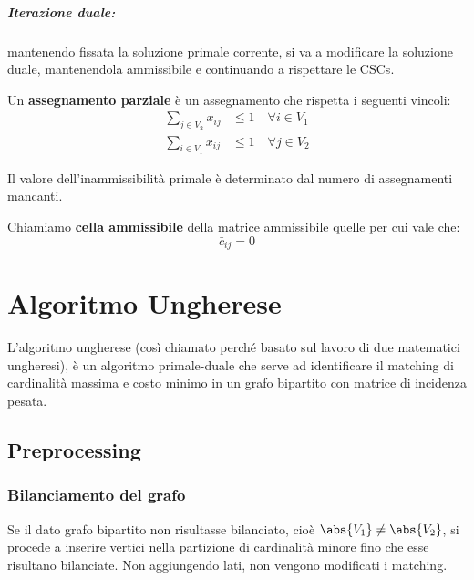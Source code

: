 \documentclass[\main/main.tex]{subfiles}
\begin{document}
\paragraph*{Iterazione duale:} mantenendo fissata la soluzione primale corrente, si va a modificare la soluzione duale, mantenendola ammissibile e continuando a rispettare le CSCs.

\begin{definition}
	Un \textbf{assegnamento parziale} è un assegnamento che rispetta i seguenti vincoli:
	\begin{align*}
		\sum_{j \in V_2} x_{ij} & \leq 1 \quad \forall i \in V_1 \\
		\sum_{i \in V_1} x_{ij} & \leq 1 \quad \forall j \in V_2
	\end{align*}
\end{definition}

\begin{definition}
	Il valore dell'inammissibilità primale è determinato dal numero di assegnamenti mancanti.
\end{definition}

\begin{definition}
	Chiamiamo \textbf{cella ammissibile} della matrice ammissibile quelle per cui vale che:
	\[
		\bar{c}_{ij} = 0
	\]
\end{definition}

\clearpage
\chapter{Algoritmo Ungherese}
L'algoritmo ungherese (così chiamato perché basato sul lavoro di due matematici ungheresi), è un algoritmo primale-duale che serve ad identificare il matching di cardinalità massima e costo minimo in un grafo bipartito con matrice di incidenza pesata.

\section{Preprocessing}
\subsection{Bilanciamento del grafo}
Se il dato grafo bipartito non risultasse bilanciato, cioè \(\abs{V_1} \neq \abs{V_2}\), si procede a inserire vertici nella partizione di cardinalità minore fino che esse risultano bilanciate. Non aggiungendo lati, non vengono modificati i matching.
\end{document}
